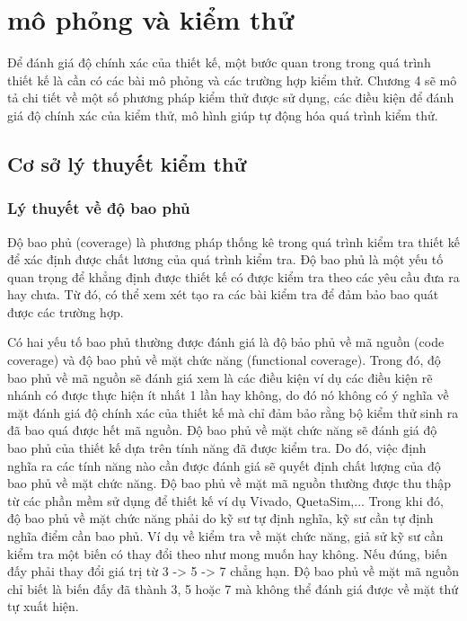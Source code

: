 \clearpage
{}

\setcounter{chapter}{3}
\chapter[{MÔ PHỎNG VÀ KIỂM THỬ}]{mô phỏng và kiểm thử}
Để đánh giá độ chính xác của thiết kế, một bước quan trong trong quá trình thiết kế là cần có các bài mô phỏng và các trường hợp kiểm thử. Chương 4 sẽ mô tả chi tiết về một số phương pháp kiểm thử được sử dụng, các điều kiện để đánh giá độ chính xác của kiểm thử, mô hình giúp tự động hóa quá trình kiểm thử.
\section{Cơ sở lý thuyết kiểm thử}
\subsection{Lý thuyết về độ bao phủ}
Độ bao phủ (coverage) là phương pháp thống kê trong quá trình kiểm tra thiết kế để xác định được chất lương của quá trình kiểm tra. Độ bao phủ là một yếu tố quan trọng để khẳng định được thiết kế có được kiểm tra theo các yêu cầu đưa ra hay chưa. Từ đó, có thể xem xét tạo ra các bài kiểm tra để đảm bảo bao quát được các trường hợp.

Có hai yếu tố bao phủ thường được đánh giá là độ bảo phủ về mã nguồn (code coverage) và độ bao phủ về mặt chức năng (functional coverage). Trong đó, độ bao phủ về mã nguồn sẽ đánh giá xem là các điều kiện ví dụ các điều kiện rẽ nhánh có được thực hiện ít nhất 1 lần hay không, do đó nó không có ý nghĩa về mặt đánh giá độ chính xác của thiết kế mà chỉ đảm bảo rằng bộ kiểm thử sinh ra đã bao quá được hết mã nguồn. Độ bao phủ về mặt chức năng sẽ đánh giá độ bao phủ của thiết kế dựa trên tính năng đã được kiểm tra. Do đó, việc định nghĩa ra các tính năng nào cần được đánh giá sẽ quyết định chất lượng của độ bao phủ về mặt chức năng. Độ bao phủ về mặt mã nguồn thường được thu thập từ các phần mềm sử dụng để thiết kế ví dụ Vivado, QuetaSim,... Trong khi đó, độ bao phủ về mặt chức năng phải do kỹ sư tự định nghĩa, kỹ sư cần tự định nghĩa điểm cần bao phủ. Ví dụ về kiểm tra về mặt chức năng, giả sử kỹ sư cần kiểm tra một biến có thay đổi theo như mong muốn hay không. Nếu đúng, biến đấy phải thay đổi giá trị từ 3 -> 5 -> 7 chẳng hạn. Độ bao phủ về mặt mã nguồn chỉ biết là biến đấy đã thành 3, 5 hoặc 7 mà không thể đánh giá được về mặt thứ tự xuất hiện.

